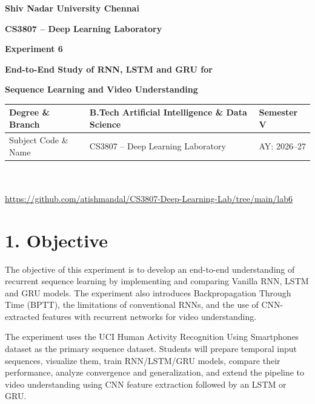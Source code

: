 \documentclass[10pt]{article}
\begin{document}

\begin{center}

{\large\textbf{Shiv Nadar University Chennai}}

\vspace{2mm}

{\normalsize\textbf{CS3807 -- Deep Learning Laboratory}}

\vspace{2mm}

{\large\textbf{Experiment 6}}

\vspace{1mm}

{\normalsize\textbf{End-to-End Study of RNN, LSTM and GRU for}}

{\normalsize\textbf{Sequence Learning and Video Understanding}}

\end{center}

\vspace{3mm}

\begin{tabular}{|p{3.4cm}|p{9.0cm}|p{1.4cm}|}
\hline
Degree \& Branch &
B.Tech Artificial Intelligence \& Data Science &
Semester V\\
\hline
Subject Code \& Name &
CS3807 -- Deep Learning Laboratory &
AY: 2026--27\\
\hline
\end{tabular}\\ \\
\url{https://github.com/atishmandal/CS3807-Deep-Learning-Lab/tree/main/lab6}
\section*{1. Objective}

The objective of this experiment is to develop an end-to-end understanding of
recurrent sequence learning by implementing and comparing Vanilla RNN, LSTM
and GRU models. The experiment also introduces Backpropagation Through Time
(BPTT), the limitations of conventional RNNs, and the use of CNN-extracted
features with recurrent networks for video understanding.

The experiment uses the UCI Human Activity Recognition Using Smartphones
dataset as the primary sequence dataset. Students will prepare temporal input
sequences, visualize them, train RNN/LSTM/GRU models, compare their
performance, analyze convergence and generalization, and extend the pipeline
to video understanding using CNN feature extraction followed by an LSTM or
GRU.
\end{document}
